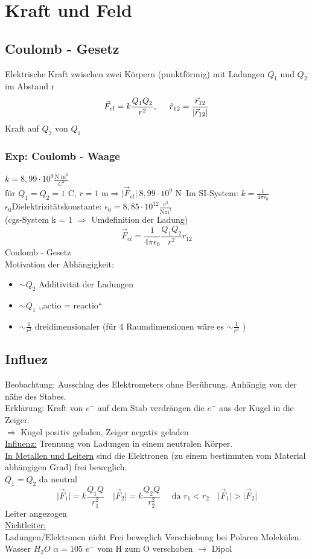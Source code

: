 \documentclass[titlepage,12pt,a4paper,ngerman]{report}
\newcommand{\tx}[1]{\textrm{#1}}
\begin{document}
\section{Kraft und Feld}
\subsection{Coulomb - Gesetz}
Elektrische Kraft zwischen zwei Körpern (punktförmig) mit Ladungen $Q_1$ und $Q_2$ im Abstand r
$$\vec{F}_{el} = k \frac{Q_1 Q_2}{r^2} , \hspace{0.5cm}\hat{r}_{12} = \frac{\vec{r}_{12}}{\vert\vec{r}_{12} \vert }$$
Kraft auf $Q_2$ von $Q_1$ 
\subsubsection*{Exp: Coulomb - Waage}
$k = 8,99 \cdot 10^{9} \frac{\tx{N m}^2}{C^2}$\\
für $Q_1 = Q_2  =1\tx{ C}$, $r =1\tx { m} \Rightarrow \vert \vec{F}_{el} \vert\  8,99 \cdot 10^{9} \tx{ N}$\
Im SI-System: $k = \frac{1}{4 \pi \epsilon_0}$\\
$\epsilon_0$Dielektrizitätskonstante: $\epsilon_0 = 8,85 \cdot 10^{12} \frac{e^2}{\tx{Nm}^2}$\\
(cgs-System k = 1 $\Rightarrow$ Umdefinition der Ladung)
$$\vec{F}_{el} = \frac{1}{4 \pi \epsilon_0 } \frac{Q_1 Q_2}{r^2}\hat{r}_{12}$$ Coulomb - Gesetz\\
Motivation der Abhängigkeit:
\begin{itemize}
\item $\sim Q_2$ Additivität der Ladungen
\item $\sim Q_1$ ,,actio = reactio``
\item $\sim \frac{1}{r^2}$ dreidimensionaler (für 4 Raumdimensionen wäre es $\sim \frac{1}{r^3}$ )
\end{itemize}

\subsection{Influez}
Beobachtung: Ausschlag des Elektrometers ohne Berührung. Anhängig von der nähe des Stabes.\\
Erklärung: Kraft von $e^-$ auf dem Stab verdrängen die $e^-$ aus der Kugel in die Zeiger.\\
$\Rightarrow$ Kugel positiv geladen, Zeiger negativ geladen\\[5pt]
\underline{Influenz:} Trennung von Ladungen in einem neutralen Körper.\\[5pt]
\underline{In Metallen und Leitern} sind die Elektronen (zu einem bestimmten vom Material abhängigen Grad) frei beweglich.\\
$Q_1 = Q_2$ da neutral
$$\vert \vec{F}_1 \vert = k \frac{Q_1 Q}{r_1^2} \quad \vert \vec{F}_2 \vert = k \frac{Q_2 Q}{r_2^2}\quad  \tx{ da } r_1 < r_2 \quad \vert \vec{F}_1 \vert > \vert \vec{F}_2 \vert$$ Leiter angezogen\\[5pt]
\underline{Nichtleiter:} \\
Ladungen/Elektronen nicht Frei beweglich Verschiebung bei Polaren Molekülen. Wasser $H_2 O$ $\alpha = 105$ $e^-$ vom H zum O verschoben $\rightarrow$ Dipol\\
\end{document}
